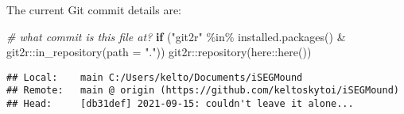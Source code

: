 \documentclass[
]{article}
\newenvironment{Shaded}{\begin{snugshade}}{\end{snugshade}}
\newcommand{\AttributeTok}[1]{\textcolor[rgb]{0.77,0.63,0.00}{#1}}
\newcommand{\CommentTok}[1]{\textcolor[rgb]{0.56,0.35,0.01}{\textit{#1}}}
\newcommand{\ControlFlowTok}[1]{\textcolor[rgb]{0.13,0.29,0.53}{\textbf{#1}}}
\newcommand{\FunctionTok}[1]{\textcolor[rgb]{0.00,0.00,0.00}{#1}}
\newcommand{\NormalTok}[1]{#1}
\newcommand{\SpecialCharTok}[1]{\textcolor[rgb]{0.00,0.00,0.00}{#1}}
\newcommand{\StringTok}[1]{\textcolor[rgb]{0.31,0.60,0.02}{#1}}
\begin{document}
The current Git commit details are:

\begin{Shaded}
\begin{Highlighting}[]
\CommentTok{\# what commit is this file at? }
\ControlFlowTok{if}\NormalTok{ (}\StringTok{"git2r"} \SpecialCharTok{\%in\%} \FunctionTok{installed.packages}\NormalTok{() }\SpecialCharTok{\&}\NormalTok{ git2r}\SpecialCharTok{::}\FunctionTok{in\_repository}\NormalTok{(}\AttributeTok{path =} \StringTok{"."}\NormalTok{)) git2r}\SpecialCharTok{::}\FunctionTok{repository}\NormalTok{(here}\SpecialCharTok{::}\FunctionTok{here}\NormalTok{())  }
\end{Highlighting}
\end{Shaded}

\begin{verbatim}
## Local:    main C:/Users/kelto/Documents/iSEGMound
## Remote:   main @ origin (https://github.com/keltoskytoi/iSEGMound)
## Head:     [db31def] 2021-09-15: couldn't leave it alone...
\end{verbatim}
\end{document}

